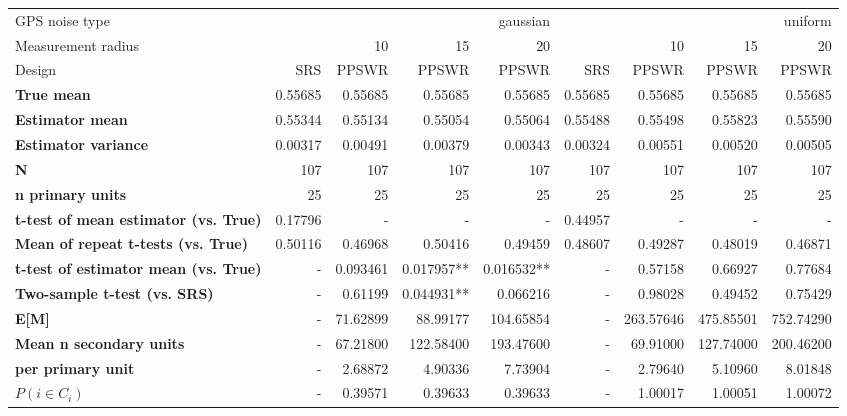 \begin{tabular}{l|r|rrr|r|rrr}
\toprule
GPS noise type & \multicolumn{4}{r}{gaussian} & \multicolumn{4}{r}{uniform} \\
Measurement radius &  & 10 & 15 & 20 &  & 10 & 15 & 20 \\
Design & SRS & PPSWR & PPSWR & PPSWR & SRS & PPSWR & PPSWR & PPSWR \\
\midrule
\textbf{True mean} &  0.55685 &  0.55685 &  0.55685 &  0.55685 &  0.55685 &  0.55685 &  0.55685 &  0.55685 \\
\textbf{Estimator mean} & 0.55344 & 0.55134 & 0.55054 & 0.55064 & 0.55488 & 0.55498 & 0.55823 & 0.55590 \\
\textbf{Estimator variance} & 0.00317 & 0.00491 & 0.00379 & 0.00343 & 0.00324 & 0.00551 & 0.00520 & 0.00505 \\
\textbf{N} & 107 & 107 & 107 & 107 & 107 & 107 & 107 & 107 \\
\textbf{n primary units} & 25 & 25 & 25 & 25 & 25 & 25 & 25 & 25 \\
\textbf{t-test of mean estimator (vs. True)} & 0.17796 & - & - & - & 0.44957 & - & - & - \\
\textbf{Mean of repeat t-tests (vs. True)} & 0.50116 & 0.46968 & 0.50416 & 0.49459 & 0.48607 & 0.49287 & 0.48019 & 0.46871 \\
\textbf{t-test of estimator mean (vs. True)} & - & 0.093461 & 0.017957** & 0.016532** & - & 0.57158 & 0.66927 & 0.77684 \\
\textbf{Two-sample t-test (vs. SRS)} & - & 0.61199 & 0.044931** & 0.066216 & - & 0.98028 & 0.49452 & 0.75429 \\
\textbf{E[M]} & - & 71.62899 & 88.99177 & 104.65854 & - & 263.57646 & 475.85501 & 752.74290 \\
\textbf{Mean n secondary units} & - & 67.21800 & 122.58400 & 193.47600 & - & 69.91000 & 127.74000 & 200.46200 \\
\textbf{     per primary unit} & - & 2.68872 & 4.90336 & 7.73904 & - & 2.79640 & 5.10960 & 8.01848 \\
\textbf{$P(i \in C_i)$} & - & 0.39571 & 0.39633 & 0.39633 & - & 1.00017 & 1.00051 & 1.00072 \\
\bottomrule
\end{tabular}
